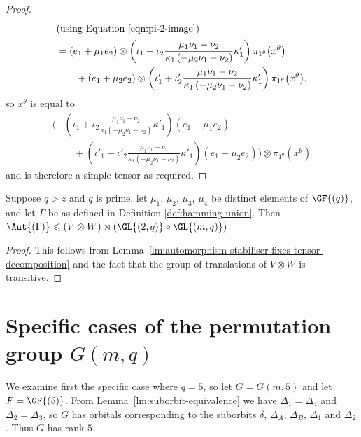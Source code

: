 \begin{proof}
\begin{align*}
    \intertext{(using Equation \eqref{eqn:pi-2-image}) }
    &= \left(e_1 + \mu_1 e_2 \right) \otimes \left(\iota_1 + \iota_2 \frac{\mu_1 \nu_1 - \nu_2}{\kappa_1 \left(-\mu_2 \nu_1 - \nu_2 \right)} \kappa'_1 \right) \pi_{1^\theta}{\left(x^\theta \right)} \\
    &\ \ \ \ \ \ + \left(e_1 + \mu_2 e_2 \right) \otimes \left(\iota'_1 + \iota'_2 \frac{\mu_1 \nu_1 - \nu_2}{\kappa_1 \left(-\mu_2 \nu_1 - \nu_2 \right)} \kappa'_1 \right) \pi_{1^\theta}{\left(x^\theta \right)},
\end{align*}
so $x^\theta$ is equal to
\begin{align*}
    \Bigg(&\left(\iota_1 + \iota_2 \frac{\mu_1 \nu_1 - \nu_2}{\kappa_1 \left(-\mu_2 \nu_1 - \nu_2 \right)} \kappa'_1 \right) \left(e_1 + \mu_1 e_2 \right)  \\
    &\quad + \left(\iota'_1 + \iota'_2 \frac{\mu_1 \nu_1 - \nu_2}{\kappa_1 \left(-\mu_2 \nu_1 - \nu_2 \right)} \kappa'_1 \right) \left(e_1 + \mu_2 e_2 \right)\Bigg) \otimes \pi_{1^\theta}{\left(x^\theta \right)}
\end{align*}
and is therefore a simple tensor as required.
\end{proof}

\begin{prop} \label{prop:automorphism-group-affine-decomp}
Suppose $q > z$ and $q$ is prime, let $\mu_1$, $\mu_2$, $\mu_3$, $\mu_4$ be distinct elements of $\GF{\left(q \right)}$, and let $\Gamma$ be as defined in Definition \ref{def:hamming-union}. Then $\Aut{\left(\Gamma \right)} \leqslant \left(V \otimes W \right) \rtimes \left(\GL{\left(2, q \right)} \circ \GL{\left(m, q \right)}\right)$.
\end{prop}
\begin{proof}
This follows from Lemma~\ref{lm:automorphism-stabiliser-fixes-tensor-decomposition} and the fact that the group of translations of $V \otimes W$ is transitive.
\end{proof}

\section{Specific cases of the permutation group \texorpdfstring{$G{\left(m, q \right)}$}{G(m,q)}} \label{sc:specific-values}

We examine first the specific case where $q = 5$, so let $G = G{\left(m, 5 \right)}$ and let $F = \GF{\left(5 \right)}$.
From Lemma~\ref{lm:suborbit-equivalence} we have $\Delta_1 = \Delta_4$ and $\Delta_2 = \Delta_3$, so $G$ has orbitals corresponding to the suborbits $\delta$, $\Delta_A$, $\Delta_B$, $\Delta_1$ and $\Delta_2$. Thus $G$ has rank $5$.

